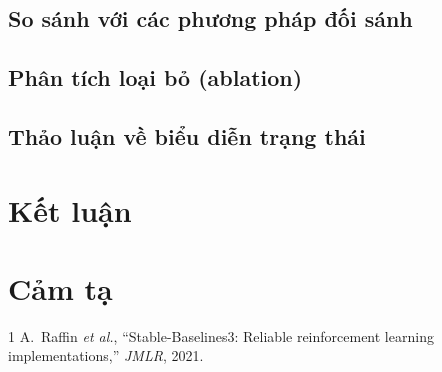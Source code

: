 \documentclass[10pt, conference, a4paper, compsocconf]{IEEEtran}
\begin{document}

\subsection{So sánh với các phương pháp đối sánh}

\subsection{Phân tích loại bỏ (ablation)}

\subsection{Thảo luận về biểu diễn trạng thái}

\section{Kết luận}

\section*{Cảm tạ}

\begin{thebibliography}{1}
 A.~Raffin \emph{et al.}, ``Stable-Baselines3: Reliable reinforcement learning implementations,'' \emph{JMLR}, 2021.
\end{thebibliography}
\end{document}
